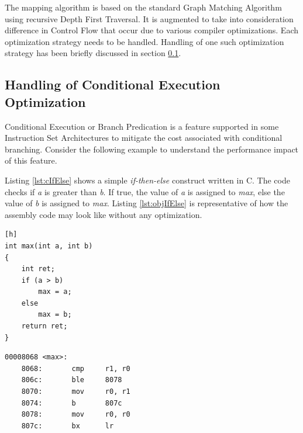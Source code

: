 The mapping algorithm is based on the standard Graph Matching Algorithm using recursive Depth First Traversal. It is augmented to take into consideration difference in Control Flow that occur due to various compiler optimizations. Each optimization strategy needs to be handled. Handling of one such optimization strategy has been briefly discussed in section \ref{subsec:CondExec}.

\subsection{Handling of Conditional Execution Optimization}
\label{subsec:CondExec}
Conditional Execution or Branch Predication is a feature supported in some Instruction Set Architectures to mitigate the cost associated with conditional branching. Consider the following example to understand the performance impact of this feature.

Listing \ref{lst:cIfElse} shows a simple \emph{if-then-else} construct written in C. The code checks if \emph{a} is greater than \emph{b}. If true, the value of \emph{a} is assigned to \emph{max}, else the value of \emph{b} is assigned to \emph{max}. Listing \ref{lst:objIfElse} is representative of how the assembly code may look like without any optimization.

\begin{center}
\begin{minipage}{0.7\textwidth}
\begin{lstlisting}[caption={Example C Code},label={lst:cIfElse}][h]
int max(int a, int b)
{
    int ret;
    if (a > b)
        max = a;
    else
        max = b;
    return ret;
}
\end{lstlisting}
\end{minipage}
\end{center}
\vspace*{-30pt}
\begin{center}
\begin{minipage}{0.7\textwidth}
\begin{lstlisting}[caption={Unoptimized Object Code},label={lst:objIfElse}]
00008068 <max>:
    8068:       cmp     r1, r0
    806c:       ble     8078   
    8070:       mov     r0, r1
    8074:       b       807c
    8078:       mov     r0, r0
    807c:       bx      lr
\end{lstlisting}
\end{minipage}
\end{center}
\vspace*{-15pt}

